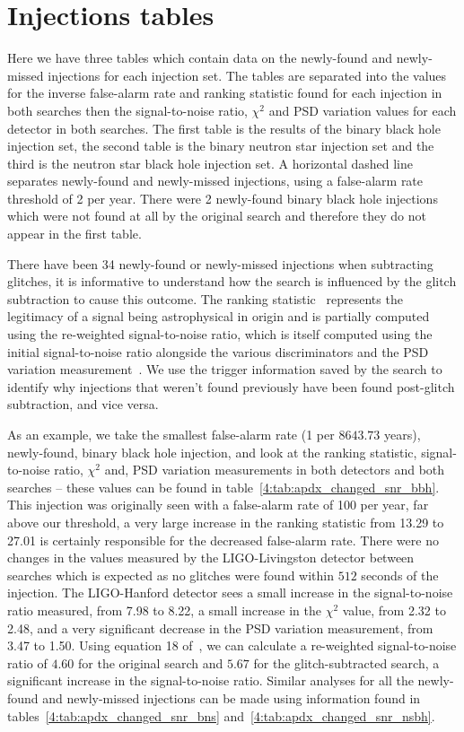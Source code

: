 \section{\label{4:sec:apdx_injections_table}Injections tables}

Here we have three tables which contain data on the newly-found and newly-missed injections for each injection set. The tables are separated into the values for the inverse false-alarm rate and ranking statistic found for each injection in both searches then the signal-to-noise ratio, $\chi^{2}$ and PSD variation values for each detector in both searches. The first table is the results of the binary black hole injection set, the second table is the binary neutron star injection set and the third is the neutron star black hole injection set. A horizontal dashed line separates newly-found and newly-missed injections, using a false-alarm rate threshold of 2 per year. There were 2 newly-found binary black hole injections which were not found at all by the original search and therefore they do not appear in the first table.

There have been 34 newly-found or newly-missed \gw{} injections when subtracting \scl{} glitches, it is informative to understand how the \gw{} search is influenced by the glitch subtraction to cause this outcome. The ranking statistic~\cite{PyCBC_global:2020} represents the legitimacy of a signal being astrophysical in origin and is partially computed using the re-weighted signal-to-noise ratio, which is itself computed using the initial signal-to-noise ratio alongside the various \gw{} discriminators and the PSD variation measurement~\cite{PSD_var:2020}. We use the trigger information saved by the \gw{} search to identify why injections that weren't found previously have been found post-glitch subtraction, and vice versa. 

As an example, we take the smallest false-alarm rate (1 per $8643.73$ years), newly-found, binary black hole injection, and look at the ranking statistic, signal-to-noise ratio, $\chi^{2}$ and, PSD variation measurements in both detectors and both searches -- these values can be found in table~\ref{4:tab:apdx_changed_snr_bbh}. This injection was originally seen with a false-alarm rate of 100 per year, far above our threshold, a very large increase in the ranking statistic from 13.29 to 27.01 is certainly responsible for the decreased false-alarm rate. There were no changes in the values measured by the LIGO-Livingston detector between searches which is expected as no \scl{} glitches were found within $512$ seconds of the injection. The LIGO-Hanford detector sees a small increase in the signal-to-noise ratio measured, from 7.98 to 8.22, a small increase in the $\chi^{2}$ value, from 2.32 to 2.48, and a very significant decrease in the PSD variation measurement, from 3.47 to 1.50. Using equation 18 of~\cite{PSD_var:2020}, we can calculate a re-weighted signal-to-noise ratio of $4.60$ for the original search and $5.67$ for the glitch-subtracted search, a significant increase in the signal-to-noise ratio. Similar analyses for all the newly-found and newly-missed injections can be made using information found in tables~\ref{4:tab:apdx_changed_snr_bns} and~\ref{4:tab:apdx_changed_snr_nsbh}.

